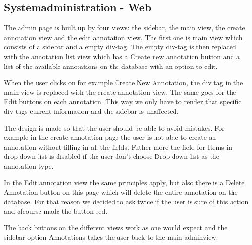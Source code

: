 \subsection{Systemadministration - Web}
The admin page is built up by four views: the sidebar, the main view, the create annotation view and the edit annotation view. The first one is main view which consists of a sidebar and a empty div-tag. 
The empty div-tag is then replaced with the annotation list view which has a Create new annotation button 
and a list of the available annotations on the database with an option to edit. 

When the user clicks on for example Create New Annotation, the div tag in the main view is replaced with the create annotation view.
The same goes for the Edit buttons on each annotation. This way we only have to render that specific div-tags current information 
and the sidebar is unaffected. 

The design is made so that the user should be able to avoid mistakes. For example in the 
create annotation page the user is not able to create an annotation without filling in all the fields. Futher more the 
field for Items in drop-down list is disabled if the user don't choose Drop-down list as the annotation type. 

In the Edit annotation view the same principles apply, but also there is a Delete Annotation button on this page which will
delete the entire annotation on the database.
For that reason we decided to ask twice if the user is sure of this action and ofcourse made the button red.

The back buttons on the different views work as one would expect and the sidebar option Annotations takes the user back to the main adminview.